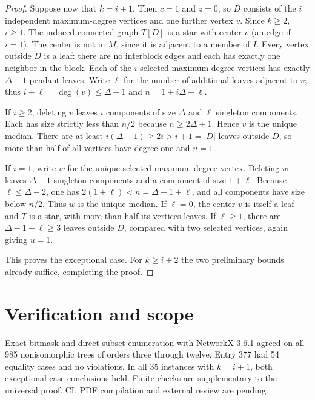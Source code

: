 \documentclass[11pt]{article}
\begin{document}
\begin{proof}
Suppose now that $k=i+1$. Then $c=1$ and $z=0$, so $D$ consists of the $i$ independent maximum-degree vertices and one further vertex $v$. Since $k\ge2$, $i\ge1$. The induced connected graph $T[D]$ is a star with center $v$ (an edge if $i=1$). The center is not in $M$, since it is adjacent to a member of $I$. Every vertex outside $D$ is a leaf: there are no interblock edges and each has exactly one neighbor in the block. Each of the $i$ selected maximum-degree vertices has exactly $\Delta-1$ pendant leaves. Write $\ell$ for the number of additional leaves adjacent to $v$; thus $i+\ell=\deg(v)\le\Delta-1$ and $n=1+i\Delta+\ell$.

If $i\ge2$, deleting $v$ leaves $i$ components of size $\Delta$ and $\ell$ singleton components. Each has size strictly less than $n/2$ because $n\ge2\Delta+1$. Hence $v$ is the unique median. There are at least $i(\Delta-1)\ge2i>i+1=|D|$ leaves outside $D$, so more than half of all vertices have degree one and $u=1$.

If $i=1$, write $w$ for the unique selected maximum-degree vertex. Deleting $w$ leaves $\Delta-1$ singleton components and a component of size $1+\ell$. Because $\ell\le\Delta-2$, one has $2(1+\ell)<n=\Delta+1+\ell$, and all components have size below $n/2$. Thus $w$ is the unique median. If $\ell=0$, the center $v$ is itself a leaf and $T$ is a star, with more than half its vertices leaves. If $\ell\ge1$, there are $\Delta-1+\ell\ge3$ leaves outside $D$, compared with two selected vertices, again giving $u=1$.

This proves the exceptional case. For $k\ge i+2$ the two preliminary bounds already suffice, completing the proof.
\end{proof}

\section{Verification and scope}
Exact bitmask and direct subset enumeration with NetworkX 3.6.1 agreed on all 985 nonisomorphic trees of orders three through twelve. Entry 377 had 54 equality cases and no violations. In all 35 instances with $k=i+1$, both exceptional-case conclusions held. Finite checks are supplementary to the universal proof. CI, PDF compilation and external review are pending.
\end{document}
